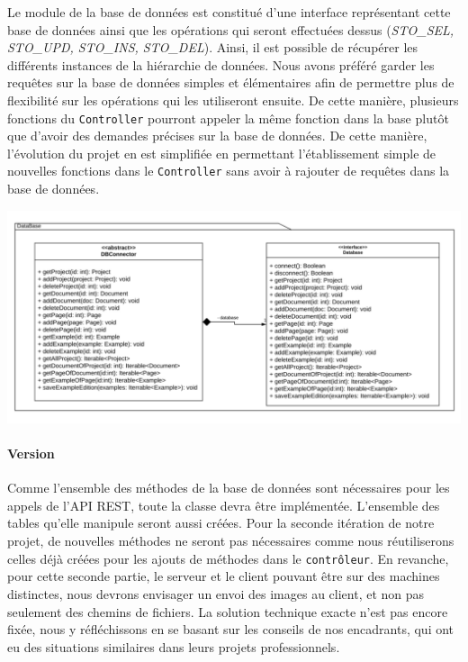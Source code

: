 Le module de la base de données est constitué d'une interface représentant cette base de données ainsi que les opérations qui seront effectuées dessus (\textit{STO\_SEL, STO\_UPD, STO\_INS, STO\_DEL}). Ainsi, il est possible de récupérer les différents instances de la hiérarchie de données. Nous avons préféré garder les requêtes sur la base de données simples et élémentaires afin de permettre plus de flexibilité sur les opérations qui les utiliseront ensuite. De cette manière, plusieurs fonctions du \texttt{Controller} pourront appeler la même fonction dans la base plutôt que d'avoir des demandes précises sur la base de données. De cette manière, l'évolution du projet en est simplifiée en permettant l'établissement simple de nouvelles fonctions dans le \texttt{Controller} sans avoir à rajouter de requêtes dans la base de données.

\newpage
\begin{mdframed}[frametitle={Figure 11 : Architecture de la base de données}, innerbottommargin=10]
\begin{center}
\includegraphics[scale=0.5]{assets/UML_Database.pdf}
\end{center}
\end{mdframed}

\paragraph{Version}
Comme l'ensemble des méthodes de la base de données sont nécessaires pour les appels de l'API REST, toute la classe devra être implémentée. L'ensemble des tables qu'elle manipule seront aussi créées. Pour la seconde itération de notre projet, de nouvelles méthodes ne seront pas nécessaires comme nous réutiliserons celles déjà créées pour les ajouts de méthodes dans le \texttt{contrôleur}. En revanche, pour cette seconde partie, le serveur et le client pouvant être sur des machines distinctes, nous devrons envisager un envoi des images au client, et non pas seulement des chemins de fichiers. La solution technique exacte n'est pas encore fixée, nous y réfléchissons en se basant sur les conseils de nos encadrants, qui ont eu des situations similaires dans leurs projets professionnels.

